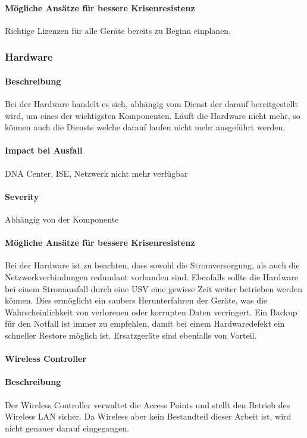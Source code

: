 \paragraph{Mögliche Ansätze für bessere Krisenresistenz}
Richtige Lizenzen für alle Geräte bereits zu Beginn einplanen.

\subsubsection{Hardware}
\paragraph{Beschreibung}
Bei der Hardware handelt es sich, abhängig vom Dienst der darauf bereitgestellt wird, um eines der wichtigsten Komponenten. Läuft die Hardware nicht mehr, so können auch die Dienste welche darauf laufen nicht mehr ausgeführt werden. 

\paragraph{Impact bei Ausfall}
DNA Center, ISE, Netzwerk nicht mehr verfügbar

\paragraph{Severity} Abhängig von der Komponente

\paragraph{Mögliche Ansätze für bessere Krisenresistenz}
Bei der Hardware ist zu beachten, dass sowohl die Stromversorgung, als auch die Netzwerkverbindungen redundant vorhanden sind. Ebenfalls sollte die Hardware bei einem Stromausfall durch eine USV eine gewisse Zeit weiter betrieben werden können. Dies ermöglicht ein saubers Herunterfahren der Geräte, was die Wahrscheinlichkeit von verlorenen oder korrupten Daten verringert. Ein Backup für den Notfall ist immer zu empfehlen, damit bei einem Hardwaredefekt ein schneller Restore möglich ist. Ersatzgeräte sind ebenfalls von Vorteil.

\paragraph{Wireless Controller}
\paragraph{Beschreibung}
Der Wireless Controller verwaltet die Access Points und stellt den Betrieb des Wireless LAN sicher. Da Wireless aber kein Bestandteil dieser Arbeit ist, wird nicht genauer darauf eingegangen.

